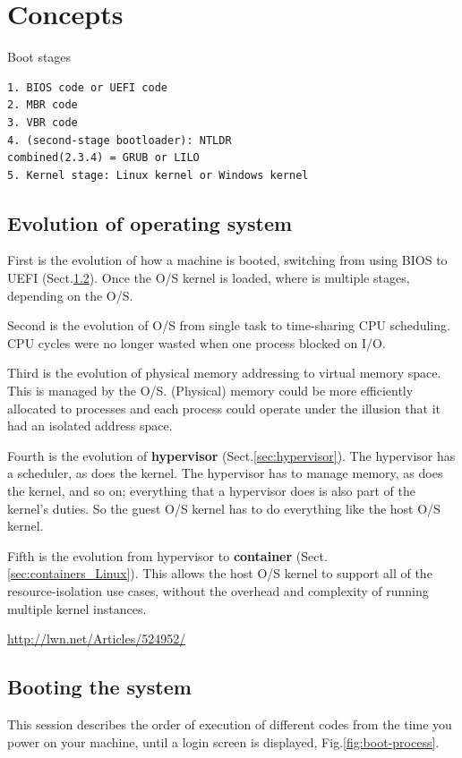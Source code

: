 \chapter{Concepts}
\label{chap:Concepts}

Boot stages
\begin{verbatim}
1. BIOS code or UEFI code
2. MBR code
3. VBR code
4. (second-stage bootloader): NTLDR
combined(2.3.4) = GRUB or LILO
5. Kernel stage: Linux kernel or Windows kernel
\end{verbatim}

\section{Evolution of operating system}

First is the evolution of how a machine is booted, switching from using BIOS to
UEFI (Sect.\ref{sec:BIOS_UEFI}). Once the O/S kernel is loaded, where is
multiple stages, depending on the O/S.

Second is the evolution of O/S from single task to time-sharing CPU scheduling.
CPU cycles were no longer wasted when one process blocked on I/O.

Third is the evolution of physical memory addressing to virtual memory space.
This is managed by the O/S. (Physical) memory could be more efficiently
allocated to processes and each process could operate under the illusion that it
had an isolated address space. 

Fourth is the evolution of {\bf hypervisor} (Sect.\ref{sec:hypervisor}). The
hypervisor has a scheduler, as does the kernel.  The hypervisor has to manage
memory, as does the kernel, and so on; everything that a hypervisor does is also
part of the kernel's duties. So the guest O/S kernel has to do everything like
the host O/S kernel.

Fifth is the evolution from hypervisor to {\bf container}
(Sect.\ref{sec:containers_Linux}). This allows the host O/S kernel to support
all of the resource-isolation use cases, without the overhead and complexity of
running multiple kernel instances.
 
\url{http://lwn.net/Articles/524952/}

\section{Booting the system}
\label{sec:BIOS_UEFI}

This session describes the order of execution of different codes from the time
you power on your machine, until a login screen is displayed,
Fig.\ref{fig:boot-process}.

